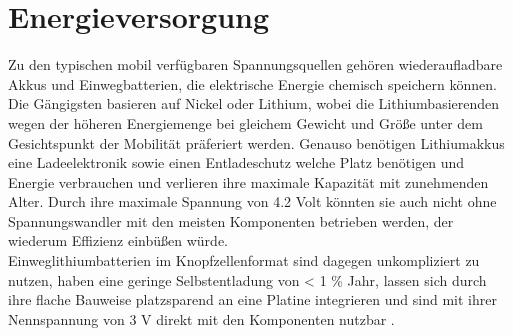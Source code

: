\section{Energieversorgung}
Zu den typischen mobil verfügbaren Spannungsquellen gehören wiederaufladbare Akkus und Einwegbatterien, die elektrische Energie chemisch speichern können.
Die Gängigsten basieren auf Nickel oder Lithium, wobei die Lithiumbasierenden wegen der höheren Energiemenge bei gleichem Gewicht und Größe unter dem Gesichtspunkt der Mobilität präferiert werden.
Genauso benötigen Lithiumakkus eine Ladeelektronik sowie einen Entladeschutz welche Platz benötigen und Energie verbrauchen und verlieren ihre maximale Kapazität mit zunehmenden Alter.
Durch ihre maximale Spannung von 4.2 Volt könnten sie auch nicht ohne Spannungswandler mit den meisten Komponenten betrieben werden, der wiederum Effizienz einbüßen würde. \cite{site_liion}\\
Einweglithiumbatterien im Knopfzellenformat sind dagegen unkompliziert zu nutzen, haben eine geringe Selbstentladung von < 1 \% Jahr, lassen sich durch ihre flache Bauweise platzsparend an eine Platine integrieren und sind mit ihrer Nennspannung von 3 V direkt mit den Komponenten nutzbar \cite{datasheet_ds6450}.
